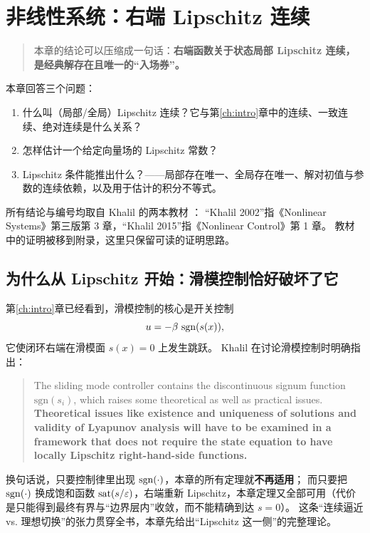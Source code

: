 \chapter{非线性系统：右端 Lipschitz 连续}\label{ch:lipschitz}

\begin{quote}
本章的结论可以压缩成一句话：\textbf{右端函数关于状态局部 Lipschitz 连续，是经典解存在且唯一的“入场券”。}
\end{quote}

本章回答三个问题：
\begin{enumerate}
  \item 什么叫（局部/全局）Lipschitz 连续？它与第\ref{ch:intro}章中的连续、一致连续、绝对连续是什么关系？
  \item 怎样估计一个给定向量场的 Lipschitz 常数？
  \item Lipschitz 条件能推出什么？——局部存在唯一、全局存在唯一、解对初值与参数的连续依赖，以及用于估计的积分不等式。
\end{enumerate}
所有结论与编号均取自 Khalil 的两本教材 \cite{khalilNonlinearSystems,khalilNonlinearControl2015}：
“Khalil 2002”指《Nonlinear Systems》第三版第 3 章，“Khalil 2015”指《Nonlinear Control》第 1 章。
教材中的证明被移到附录，这里只保留可读的证明思路。

\section{为什么从 Lipschitz 开始：滑模控制恰好破坏了它}\label{sec:why-lipschitz}

第\ref{ch:intro}章已经看到，滑模控制的核心是开关控制
\begin{equation}\label{eq:sgn-control}
  u = -\beta\,\operatorname{sgn}(s(x)),
\end{equation}
它使闭环右端在滑模面 $s(x)=0$ 上发生跳跃。
Khalil 在讨论滑模控制时明确指出：

\begin{quote}
The sliding mode controller contains the discontinuous signum function $\mathrm{sgn}(s_i)$, which raises some theoretical as well as practical issues.
\textbf{Theoretical issues like existence and uniqueness of solutions and validity of Lyapunov analysis will have to be examined in a framework that does not require the state equation to have locally Lipschitz right-hand-side functions.}
\cite[§14.1.2]{khalilNonlinearSystems}
\end{quote}

换句话说，只要控制律里出现 $\operatorname{sgn}(\cdot)$，本章的所有定理就\textbf{不再适用}；
而只要把 $\operatorname{sgn}(\cdot)$ 换成饱和函数 $\operatorname{sat}(s/\varepsilon)$，右端重新 Lipschitz，本章定理又全部可用（代价是只能得到最终有界与“边界层内”收敛，而不能精确到达 $s=0$）。
这条“连续逼近 vs. 理想切换”的张力贯穿全书，本章先给出“Lipschitz 这一侧”的完整理论。

